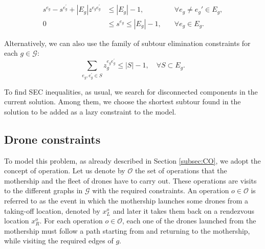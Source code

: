\begin{align}
    s^{e_g} - s^{e^\prime_g} + |E_g|z^{e_ge^\prime_g} & \leq |E_g| - 1  , &\quad\forall e_g \neq e_g'\in E_g, \tag{MTZ$_1$} \label{NOMTZ1}\\
    0 & \leq s^{e_g} \leq |E_g| - 1, &\quad\forall e_g\in E_g.\tag{MTZ$_2$}\label{NOMTZ2}
\end{align}

\noindent
Alternatively, we can also use the family of subtour elimination constraints for each $g\in\mathcal G$:
\begin{equation}\tag{SEC}\label{NOSEC}
    \sum_{e_g, e^\prime_g \in S} z_g^{e_ge^\prime_g} \leq |S| - 1, \quad \forall S\subset E_g.
\end{equation}

\noindent
To find SEC inequalities, as usual, we search for disconnected components in the current solution. Among them, we choose the shortest subtour found in the solution to be added as a lazy constraint to the model.\\

\subsection*{Drone constraints}
\noindent
To model this problem, as already described in Section \ref{subsec:CO}, we adopt the concept of operation.
Let us denote by $\mathcal O$ the set of operations that the mothership and the fleet of drones have to carry out. These operations are visits to the different graphs in $\mathcal G$ with the required constraints. An operation $o\in\mathcal O$ is referred to as the event in which the mothership launches some drones from a taking-off location, denoted by $x_L^o$ and later it takes them back on a rendezvous location $x_R^o$. 
\noindent
For each operation $o\in\mathcal O$, each one of the drones launched from the mothership must follow a path starting from and returning to the mothership, while visiting the required edges of $g$.



